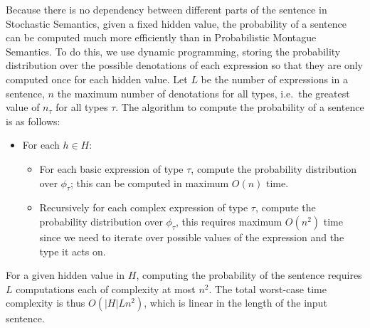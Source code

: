 \documentclass[11pt]{article}
\theoremstyle{definition}
\begin{document}
Because there is no dependency between different parts of the sentence
in Stochastic Semantics, given a fixed hidden value, the probability
of a sentence can be computed much more efficiently than in
Probabilistic Montague Semantics. To do this, we use dynamic
programming, storing the probability distribution over the possible
denotations of each expression so that they are only computed once for
each hidden value. Let $L$ be the number of expressions in a sentence,
$n$ the maximum number of denotations for all types, i.e.~the greatest
value of $n_\tau$ for all types $\tau$. The algorithm to compute the
probability of a sentence is as follows:
\begin{itemize}
\item For each $h\in H$:
\begin{itemize}
\item For each basic expression of type $\tau$, compute the
  probability distribution over $\phi_\tau$; this can be computed in
  maximum $O(n)$ time.
\item Recursively for each complex expression of type $\tau$, compute
  the probability distribution over $\phi_\tau$, this requires maximum
  $O(n^2)$ time since we need to iterate over possible values of the
  expression and the type it acts on.
\end{itemize}
\end{itemize}
For a given hidden value in $H$, computing the probability of the sentence requires $L$
computations each of complexity at most $n^2$. The total worst-case
time complexity is thus $O(|H|Ln^2)$, which is linear in the length of the input sentence. 





\end{document}
